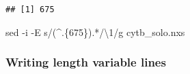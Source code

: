 \documentclass[
]{article}
\newenvironment{Shaded}{\begin{snugshade}}{\end{snugshade}}
\newcommand{\AttributeTok}[1]{\textcolor[rgb]{0.77,0.63,0.00}{#1}}
\newcommand{\FunctionTok}[1]{\textcolor[rgb]{0.00,0.00,0.00}{#1}}
\newcommand{\NormalTok}[1]{#1}
\newcommand{\StringTok}[1]{\textcolor[rgb]{0.31,0.60,0.02}{#1}}
\begin{document}
\begin{verbatim}
## [1] 675
\end{verbatim}

\begin{Shaded}
\begin{Highlighting}[]
\FunctionTok{sed} \AttributeTok{{-}i} \AttributeTok{{-}E} \StringTok{\textquotesingle{}s/(\^{}.\{675\}).*/\textbackslash{}1/g\textquotesingle{}}\NormalTok{ cytb\_solo.nxs}
\end{Highlighting}
\end{Shaded}

\hypertarget{writing-length-variable-lines-2}{%
\subsubsection{Writing length variable
lines}\label{writing-length-variable-lines-2}}
\end{document}
